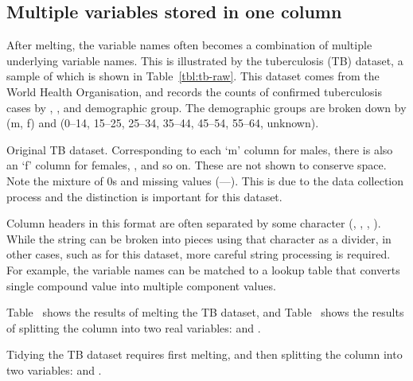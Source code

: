 \documentclass[article]{jss}
\begin{document}
\subsection{Multiple variables stored in one column}

After melting, the  variable names often becomes a combination of multiple underlying variable names. This is illustrated by the tuberculosis (TB) dataset, a sample of which is shown in Table~\ref{tbl:tb-raw}. This dataset comes from the World Health Organisation, and records the counts of confirmed tuberculosis cases by , , and demographic group. The demographic groups are broken down by  (m, f) and  (0--14, 15--25, 25--34, 35--44, 45--54, 55--64, unknown). 

\begin{table}[htbp]
  \centering
  
  \caption{Original TB dataset. Corresponding to each `m' column for males, there is also an `f' column for females, ,  and so on. These are not shown to conserve space. Note the mixture of 0s and missing values (---). This is due to the data collection process and the distinction is important for this dataset.}
  \label{tbl:tb-raw}
\end{table}

Column headers in this format are often separated by some character (, \code{-}, \code{\_}, \code{:}). While the string can be broken into pieces using that character as a divider, in other cases, such as for this dataset, more careful string processing is required. For example, the variable names can be matched to a lookup table that converts single compound value into multiple component values. 

Table~ shows the results of melting the TB dataset, and Table~ shows the results of splitting the column  into two real variables:  and .  

\begin{table}[htbp]
  \centering
  \hspace{2em}%
  
  \caption{Tidying the TB dataset requires first melting, and then splitting the  column into two variables:  and .}
  \label{tbl:tb-clean}
\end{table}
\end{document}
